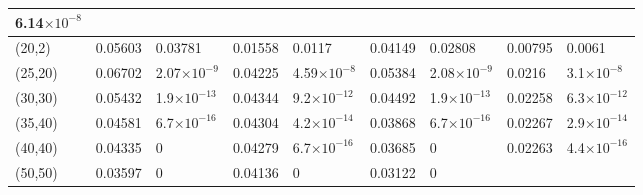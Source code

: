 \documentclass[10pt,twosided]{article}
\numberwithin{equation}{section}
\numberwithin{equation}{section}
\begin{document}
\begin{table}
\begin{tabular}{|p{41pt}|p{32pt}|p{38pt}|p{32pt}|p{38pt}|p{32pt}|p{38pt}|p{32pt}|p{38pt}|}
{\small{6.14$\times10^{-8}$}
} \\
\hline
\parbox{41pt}{\raggedright
(20,2)
} & \parbox{32pt}{\raggedright
0.05603
} & \parbox{38pt}{\raggedright
0.03781
} & \parbox{32pt}{\raggedright
0.01558
} & \parbox{38pt}{\raggedright
0.0117
} & \parbox{32pt}{\raggedright
0.04149
} & \parbox{38pt}{\raggedright
0.02808
} & \parbox{32pt}{\raggedright
0.00795
} & \parbox{38pt}{\raggedright
0.0061
} \\
\hline
\parbox{41pt}{\raggedright
(25,20)
} & \parbox{32pt}{\raggedright
0.06702
} & \parbox{38pt}{\raggedright
\small{2.07$\times10^{-9}$}
} & \parbox{32pt}{\raggedright
0.04225
} & \parbox{38pt}{\raggedright
\small{4.59$\times10^{-8}$}
} & \parbox{32pt}{\raggedright
0.05384
} & \parbox{38pt}{\raggedright
\small{2.08$\times10^{-9}$}
} & \parbox{32pt}{\raggedright
0.0216
} & \parbox{38pt}{\raggedright
\small{3.1$\times10^{-8}$}
} \\
\hline
\parbox{41pt}{\raggedright
(30,30)
} & \parbox{32pt}{\raggedright
0.05432
} & \parbox{38pt}{\raggedright
\small{1.9$\times10^{-13}$}
} & \parbox{32pt}{\raggedright
0.04344
} & \parbox{38pt}{\raggedright
\small{9.2$\times10^{-12}$}
} & \parbox{32pt}{\raggedright
0.04492
} & \parbox{38pt}{\raggedright
\small{1.9$\times10^{-13}$}
} & \parbox{32pt}{\raggedright
0.02258
} & \parbox{38pt}{\raggedright
\small{6.3$\times10^{-12}$}
} \\
\hline
\parbox{41pt}{\raggedright
(35,40)
} & \parbox{32pt}{\raggedright
0.04581
} & \parbox{38pt}{\raggedright
\small{6.7$\times10^{-16}$}
} & \parbox{32pt}{\raggedright
0.04304
} & \parbox{38pt}{\raggedright
\small{4.2$\times10^{-14}$}
} & \parbox{32pt}{\raggedright
0.03868
} & \parbox{38pt}{\raggedright
\small{6.7$\times10^{-16}$}
} & \parbox{32pt}{\raggedright
0.02267
} & \parbox{38pt}{\raggedright
\small{2.9$\times10^{-14}$}
} \\
\hline
\parbox{41pt}{\raggedright
(40,40)
} & \parbox{32pt}{\raggedright
0.04335
} & \parbox{38pt}{\raggedright
0
} & \parbox{32pt}{\raggedright
0.04279
} & \parbox{38pt}{\raggedright
\small{6.7$\times10^{-16}$}
} & \parbox{32pt}{\raggedright
0.03685
} & \parbox{38pt}{\raggedright
0
} & \parbox{32pt}{\raggedright
0.02263
} & \parbox{38pt}{\raggedright
\small{4.4$\times10^{-16}$}
} \\
\hline
\parbox{41pt}{\raggedright
(50,50)
} & \parbox{32pt}{\raggedright
0.03597
} & \parbox{38pt}{\raggedright
0
} & \parbox{32pt}{\raggedright
0.04136
} & \parbox{38pt}{\raggedright
0
} & \parbox{32pt}{\raggedright
0.03122
} & \parbox{38pt}{\raggedright
0
} & \parbox{32pt}{\raggedright
}
\end{tabular}
\end{table}
\end{document}
